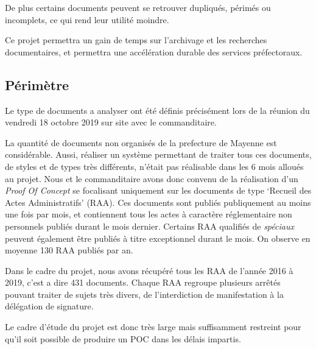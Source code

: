 De plus certains documents peuvent se retrouver dupliqués, périmés ou incomplets, ce qui rend leur utilité moindre.

Ce projet permettra un gain de temps sur l'archivage et les recherches documentaires, et permettra une accélération durable des services préfectoraux.


\subsection{Périmètre}
Le type de documents a analyser ont été définis précisément lors de la réunion du vendredi 18 octobre 2019 sur site avec le commanditaire.

La quantité de documents non organisés de la prefecture de Mayenne est considérable.
Aussi, réaliser un système permettant de traiter tous ces documents, de styles et de types très différents, n'était pas réalisable dans les 6 mois alloués au projet.
Nous et le commanditaire avons donc convenu de la réalisation d'un \textit{Proof Of Concept} se focalisant uniquement sur les documents de type `Recueil des Actes Administratifs' (RAA).
Ces documents sont publiés publiquement au moins une fois par mois, et contiennent tous les actes à caractère réglementaire non personnels publiés durant le mois dernier.
Certains RAA qualifiés de \textit{spéciaux} peuvent également être publiés à titre exceptionnel durant le mois.
On observe en moyenne 130 RAA publiés par an.

Dans le cadre du projet, nous avons récupéré tous les RAA de l'année 2016 à 2019, c'est a dire 431 documents.
Chaque RAA regroupe plusieurs arrêtés pouvant traiter de sujets très divers, de l'interdiction de manifestation à la délégation de signature.

Le cadre d'étude du projet est donc très large mais suffisamment restreint pour qu'il soit possible de produire un POC dans les délais impartis. 



